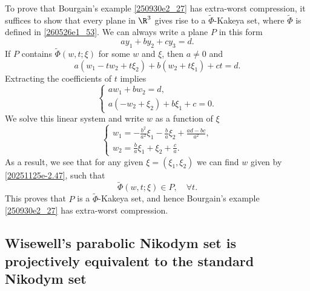 \documentclass{article}
\numberwithin{equation}{section}
\theoremstyle{plain}
\begin{document}
To prove that Bourgain's example \eqref{250930e2_27} has extra-worst compression, it suffices to show that every plane in $\R^3$ gives rise to a $\widetilde{\Phi}$-Kakeya set, where $\widetilde{\Phi}$ is defined in \eqref{260526e1_53}. We can always write a plane $P$ in this form
\begin{equation}
    ay_1+ by_2+ cy_3 =d.
\end{equation}
If $P$ contains $\widetilde{\Phi}(w,t;\xi)$ for some $w$ and $\xi$, then $a\neq 0$ and 
\begin{equation}
    a (w_1 - tw_2 + t\xi_2)+ b (w_2+ t\xi_1)+ c t= d.
\end{equation}
Extracting the coefficients of $t$ implies
\begin{equation}\label{20251125e-2.46}
    \begin{cases}
    aw_1 + bw_2 =d,  \\
    a(-w_2+ \xi_2)+ b\xi_1+ c=0.
\end{cases}
\end{equation}
We solve this linear system and write $w$ as a function of $\xi$
\begin{equation}\label{20251125e-2.47}
    \begin{cases}
    w_1 = -\frac{b^2}{a^2}\xi_1- \frac{b}{a}\xi_2+ \frac{ad-bc}{a^2}, \\
    w_2 = \frac{b}{a}\xi_1+ \xi_2+ \frac{c}{a}.
\end{cases}
\end{equation}
As a result, we see that for any given $\xi=(\xi_1,\xi_2)$ we can find $w$ given by \eqref{20251125e-2.47}, such that
\begin{equation}
    \widetilde{\Phi}(w,t;\xi)\in P, \quad \forall t.
\end{equation}
This proves that $P$ is a $\widetilde{\Phi}$-Kakeya set, and hence Bourgain's example \eqref{250930e2_27} has extra-worst compression.

















\subsection{Wisewell's parabolic Nikodym set is projectively equivalent to the standard Nikodym set}
\end{document}

